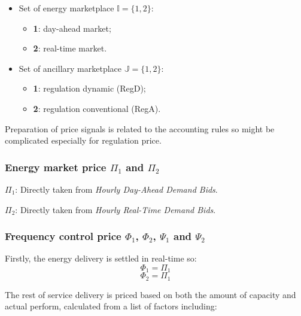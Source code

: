 \begin{itemize}
	\item Set of energy marketplace $\mathbb{I} = \{1,2\}$:
	\begin{itemize}
		\item \textbf{1}: day-ahead market;
		\item \textbf{2}: real-time market.
	\end{itemize}
	\item Set of ancillary marketplace $\mathbb{J}=\{1,2\}$:
	\begin{itemize}
		\item \textbf{1}: regulation dynamic (RegD);
		\item \textbf{2}: regulation conventional (RegA).
	\end{itemize}
\end{itemize}

Preparation of price signals is related to the accounting rules\cite{PJM2017} so might be complicated especially for regulation price.

\subsubsection{Energy market price $\Pi_1$ and $\Pi_2$}

$\Pi_1$: Directly taken from \textit{Hourly Day-Ahead Demand Bids}.

$\Pi_2$:
Directly taken from \textit{Hourly Real-Time Demand Bids}.
\subsubsection{Frequency control price $\Phi_1$, $\Phi_2$, $\Psi_1$ and $\Psi_2$}

Firstly, the energy delivery is settled in real-time so:
\begin{equation*}
\Phi_1 = \Pi_1
\end{equation*}
\begin{equation*}
\Phi_2 = \Pi_1
\end{equation*}

The rest of service delivery is priced based on both the amount of capacity and actual perform, calculated from a list of factors including:

